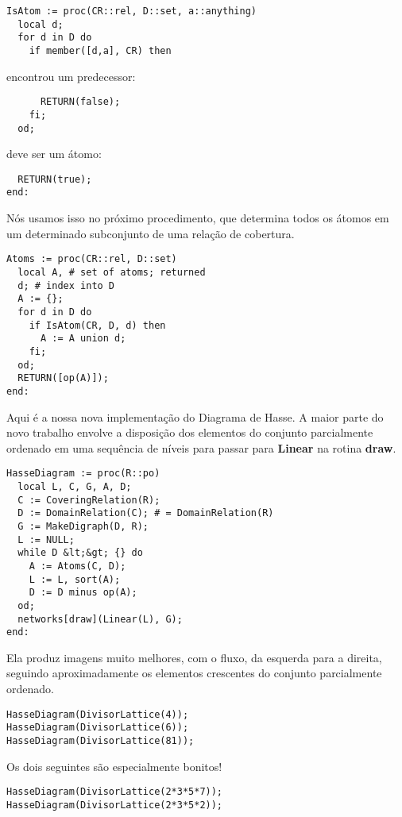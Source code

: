\documentclass[a4paper]{article}
\begin{document}
\begin{lstlisting}
IsAtom := proc(CR::rel, D::set, a::anything)
  local d;
  for d in D do
    if member([d,a], CR) then
\end{lstlisting}
encontrou um predecessor:
\begin{lstlisting}
      RETURN(false);
    fi;
  od;
\end{lstlisting}
deve ser um átomo:
\begin{lstlisting}
  RETURN(true);
end:
\end{lstlisting}

Nós usamos isso no próximo procedimento, que determina todos os átomos em um determinado subconjunto de uma relação de cobertura.

\begin{lstlisting}
Atoms := proc(CR::rel, D::set)
  local A, # set of atoms; returned
  d; # index into D
  A := {};
  for d in D do
    if IsAtom(CR, D, d) then
      A := A union d;
    fi;
  od;
  RETURN([op(A)]);
end:
\end{lstlisting}

Aqui é a nossa nova implementação do Diagrama de Hasse. A maior parte do novo trabalho envolve a disposição dos elementos do conjunto parcialmente ordenado em uma sequência de níveis para passar para \textbf{Linear} na rotina \textbf{draw}.

\begin{lstlisting}
HasseDiagram := proc(R::po)
  local L, C, G, A, D;
  C := CoveringRelation(R);
  D := DomainRelation(C); # = DomainRelation(R)
  G := MakeDigraph(D, R);
  L := NULL;
  while D &lt;&gt; {} do
    A := Atoms(C, D);
    L := L, sort(A);
    D := D minus op(A);
  od;
  networks[draw](Linear(L), G);
end:
\end{lstlisting}

Ela produz imagens muito melhores, com o fluxo, da esquerda para a direita, seguindo aproximadamente os elementos crescentes do conjunto parcialmente ordenado.

\begin{lstlisting}
HasseDiagram(DivisorLattice(4));
HasseDiagram(DivisorLattice(6));
HasseDiagram(DivisorLattice(81));
\end{lstlisting}

Os dois seguintes são especialmente bonitos!

\begin{lstlisting}
HasseDiagram(DivisorLattice(2*3*5*7));
HasseDiagram(DivisorLattice(2*3*5*2));
\end{lstlisting}
\end{document}
